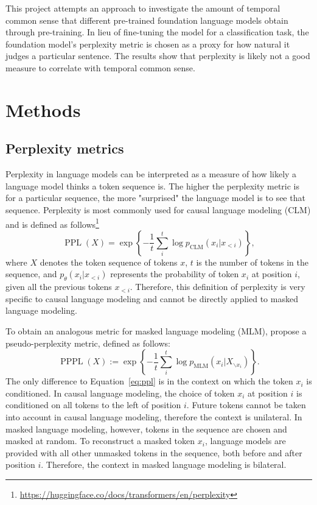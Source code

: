 \documentclass[11pt]{article}
\DeclareMathOperator{\PPL}{PPL}
\DeclareMathOperator{\PPPL}{PPPL}
\begin{document}
This project attempts an approach to investigate the amount of temporal common sense that different pre-trained foundation language models obtain through pre-training. In lieu of fine-tuning the model for a classification task, the foundation model's perplexity metric is chosen as a proxy for how natural it judges a particular sentence. The results show that perplexity is likely not a good measure to correlate with temporal common sense.

\section{Methods} %
\label{sec:Methods}

\subsection{Perplexity metrics}
\label{sec:ppl}
Perplexity in language models can be interpreted as a measure of how likely a language model thinks a token sequence is. The higher the perplexity metric is for a particular sequence, the more "surprised" the language model is to see that sequence. Perplexity is most commonly used for causal language modeling (CLM) and is defined as follows\footnote{\url{https://huggingface.co/docs/transformers/en/perplexity}}
\begin{equation}
  \PPL(X) = \exp \left\{ - \frac{1}{t} \sum^t_i \log p_\text{CLM} (x_i | x_{<i}) \right\},
  \label{eq:ppl}
\end{equation}
where $X$ denotes the token sequence of tokens $x$, $t$ is the number of tokens in the sequence, and $p_\theta(x_i | x_{<i})$ represents the probability of token $x_i$ at position $i$, given all the previous tokens $x_{<i}$. Therefore, this definition of perplexity is very specific to causal language modeling and cannot be directly applied to masked language modeling.

To obtain an analogous metric for masked language modeling (MLM), \citet{pppl} propose a pseudo-perplexity metric, defined as follows:
\begin{equation}
  \PPPL(X) := \exp \left\{ - \frac{1}{t} \sum^t_i \log p_\text{MLM} (x_i | X_{\backslash x_i}) \right\}.
  \label{eq:pppl}
\end{equation}
The only difference to Equation~\ref{eq:ppl} is in the context on which the token $x_i$ is conditioned. In causal language modeling, the choice of token $x_i$ at position $i$ is conditioned on all tokens to the left of position $i$. Future tokens cannot be taken into account in causal language modeling, therefore the context is unilateral. In masked language modeling, however, tokens in the sequence are chosen and masked at random. To reconstruct a masked token $x_i$, language models are provided with all other unmasked tokens in the sequence, both before and after position $i$. Therefore, the context in masked language modeling is bilateral.
\end{document}

